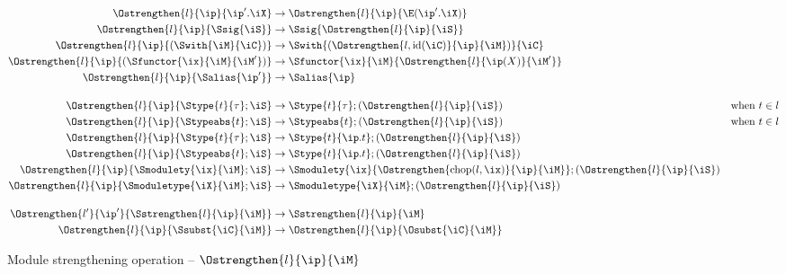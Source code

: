 \begin{align*}
  \Ostrengthen{l}{\ip}{\ip'.\iX}
  &\to \Ostrengthen{l}{\ip}{\E(\ip'.\iX)}\\
  \Ostrengthen{l}{\ip}{\Ssig{\iS}}
  &\to \Ssig{\Ostrengthen{l}{\ip}{\iS}}\\
  \Ostrengthen{l}{\ip}{(\Swith{\iM}{\iC})}
  &\to \Swith{(\Ostrengthen{l,\operatorname{id}(\iC)}{\ip}{\iM})}{\iC}\\
  \Ostrengthen{l}{\ip}{(\Sfunctor{\ix}{\iM}{\iM'})}
  &\to \Sfunctor{\ix}{\iM}{\Ostrengthen{l}{\ip(X)}{\iM'}}\\
  \Ostrengthen{l}{\ip}{\Salias{\ip'}}
  &\to \Salias{\ip}\\[4mm]
  \Ostrengthen{l}{\ip}{\Stype{t}{\tau};\iS}
  &\to \Stype{t}{\tau};(\Ostrengthen{l}{\ip}{\iS}) &\text{when } t\in l\\
  \Ostrengthen{l}{\ip}{\Stypeabs{t};\iS}
  &\to \Stypeabs{t};(\Ostrengthen{l}{\ip}{\iS}) &\text{when } t\in l\\
  \Ostrengthen{l}{\ip}{\Stype{t}{\tau};\iS}
  &\to \Stype{t}{\ip.t};(\Ostrengthen{l}{\ip}{\iS}) \\
  \Ostrengthen{l}{\ip}{\Stypeabs{t};\iS}
  &\to \Stype{t}{\ip.t};(\Ostrengthen{l}{\ip}{\iS}) \\
  \Ostrengthen{l}{\ip}{\Smodulety{\ix}{\iM};\iS}
  &\to \Smodulety{\ix}{\Ostrengthen{\operatorname{chop}(l,\ix)}{\ip}{\iM}};
    (\Ostrengthen{l}{\ip}{\iS}) \\
  \Ostrengthen{l}{\ip}{\Smoduletype{\iX}{\iM};\iS}
  &\to \Smoduletype{\iX}{\iM};
    (\Ostrengthen{l}{\ip}{\iS}) \\[4mm]
  \Ostrengthen{l'}{\ip'}{\Sstrengthen{l}{\ip}{\iM}}
  &\to \Sstrengthen{l}{\ip}{\iM}\\
  \Ostrengthen{l}{\ip}{\Ssubst{\iC}{\iM}}
  &\to \Ostrengthen{l}{\ip}{\Osubst{\iC}{\iM}}\\
\end{align*}\vspace{-3mm}
\caption{Module strengthening operation -- $\Ostrengthen{l}{\ip}{\iM}$}
\label{module:strengthen}

